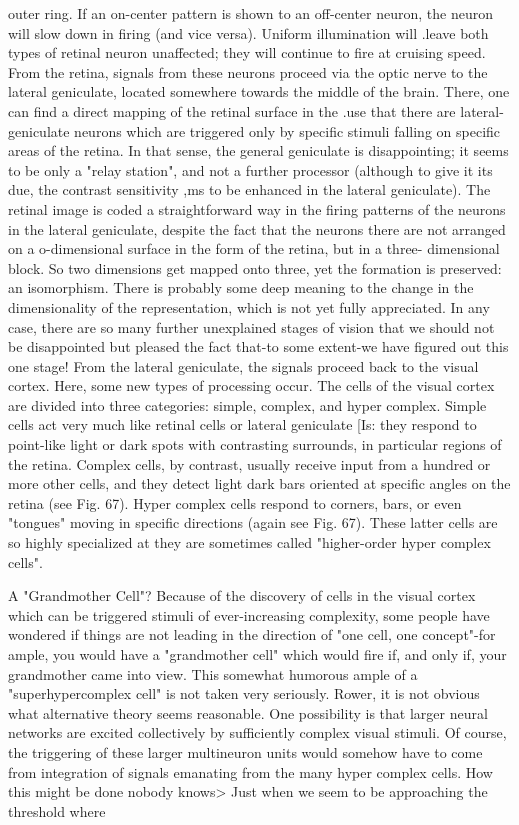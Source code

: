 outer ring. If an on-center pattern is shown to an off-center neuron, the neuron will slow
down in firing (and vice versa). Uniform illumination will .leave both types of retinal
neuron unaffected; they will continue to fire at cruising speed.
  From the retina, signals from these neurons proceed via the optic nerve to the lateral
geniculate, located somewhere towards the middle of the brain. There, one can find a
direct mapping of the retinal surface in the .use that there are lateral-geniculate neurons
which are triggered only by specific stimuli falling on specific areas of the retina. In that
sense, the general geniculate is disappointing; it seems to be only a "relay station", and
not a further processor (although to give it its due, the contrast sensitivity ,ms to be
enhanced in the lateral geniculate). The retinal image is coded a straightforward way in
the firing patterns of the neurons in the lateral geniculate, despite the fact that the neurons
there are not arranged on a o-dimensional surface in the form of the retina, but in a three-
dimensional block. So two dimensions get mapped onto three, yet the formation is
preserved: an isomorphism. There is probably some deep meaning to the change in the
dimensionality of the representation, which is not yet fully appreciated. In any case, there
are so many further unexplained stages of vision that we should not be disappointed but
pleased the fact that-to some extent-we have figured out this one stage!
  From the lateral geniculate, the signals proceed back to the visual cortex. Here, some
new types of processing occur. The cells of the visual cortex are divided into three
categories: simple, complex, and hyper complex. Simple cells act very much like retinal
cells or lateral geniculate [Is: they respond to point-like light or dark spots with
contrasting surrounds, in particular regions of the retina. Complex cells, by contrast,
usually receive input from a hundred or more other cells, and they detect light dark bars
oriented at specific angles on the retina (see Fig. 67). Hyper complex cells respond to
corners, bars, or even "tongues" moving in specific directions (again see Fig. 67). These
latter cells are so highly specialized at they are sometimes called "higher-order hyper
complex cells".

                                A "Grandmother Cell"?
  Because of the discovery of cells in the visual cortex which can be triggered stimuli of
ever-increasing complexity, some people have wondered if things are not leading in the
direction of "one cell, one concept"-for ample, you would have a "grandmother cell"
which would fire if, and only if, your grandmother came into view. This somewhat
humorous ample of a "superhypercomplex cell" is not taken very seriously. Rower, it is
not obvious what alternative theory seems reasonable. One possibility is that larger neural
networks are excited collectively by sufficiently complex visual stimuli. Of course, the
triggering of these larger multineuron units would somehow have to come from
integration of signals emanating from the many hyper complex cells. How this might be
done nobody knows> Just when we seem to be approaching the threshold where




